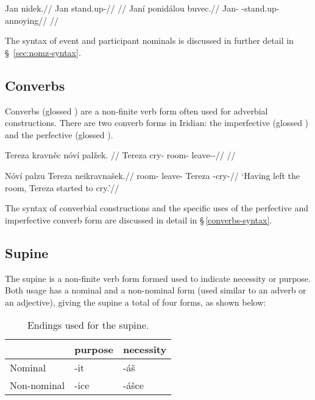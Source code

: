 \pex
\a
\begingl
\gla Jan nidek.//
\glb Jan stand.up-//
\glft {}//
\endgl
\a
\begingl
\gla Janí ponidálou buvec.//
\glb Jan-\Gen{} -stand.up- annoying//
\glft {}//
\endgl
\xe

The syntax of event and participant nominals is discussed in further detail in \S~\ref{sec:nomz-syntax}.

\subsection{Converbs}
Converbs (glossed \Cv{}) are a non-finite verb form often used for adverbial constructions. There are two converb forms in Iridian: the imperfective  (glossed ) and the perfective  (glossed ).

\pex
\begingl
\gla Tereza kravn\v{e}c nóví palžek. //
\glb Tereza cry- room-\Gen{} leave-\Av{}-\Pf{}//
\glft {}//
\endgl
\xe

\pex
\begingl
\gla Nóví palzu Tereza neikravnašek.//
\glb room-\Gen{} leave- Tereza -cry-//
\glft `Having left the room, Tereza started to cry.'//
\endgl
\xe

The syntax of converbial constructions and the specific uses of the perfective and imperfective converb form are discussed in detail in \S\,\ref{converbs-syntax}.


\subsection{Supine}

The {\cscaps supine} is a non-finite verb form formed used to indicate necessity or purpose. Both usage has a nominal and a non-nominal form (used similar to an adverb or an adjective), giving the supine a total of four forms, as shown below:

\begin{table}[ht!]
	\sffamily\footnotesize
	\caption{Endings used for the supine.}
	\medskip
	\begin{tabu} to 0.6
		\toprule
		&{\sc purpose}&{\sc necessity}\\
		\midrule
		Nominal & {-it} & {-áš}\\
		Non-nominal & {-ice} & {-ášce}\\
		\bottomrule
	\end{tabu}
\end{table}

